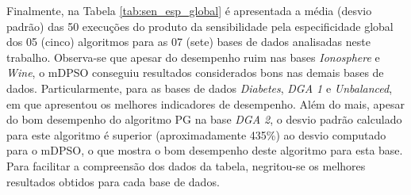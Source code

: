 \documentclass[
	12pt,				%
	openany,			%
	oneside,	
	a4paper,			%
	brazil,				%
	]{unimontes-ppgmsc-abntex2}
\begin{document}
\begin{table}[!ht]
\setlength{\arrayrulewidth}{.2em}
\vspace{12pt}
\centering{}
\caption{Desempenho dos algoritmos segundo a métrica sensibilidade $\times$ especificidade para cada classe da base {\em Wine}.}
\label{tab:sen_esp_classe_wine}
\end{table}

Finalmente, na Tabela \ref{tab:sen_esp_global} é apresentada a média (desvio padrão) das 50 execuções do produto da sensibilidade pela especificidade global dos 05 (cinco) algoritmos para as 07 (sete) bases de dados analisadas neste trabalho. Observa-se que apesar do desempenho ruim nas bases {\em Ionosphere} e {\em Wine}, o mDPSO conseguiu resultados considerados bons nas demais bases de dados. Particularmente, para as bases de dados {\em Diabetes}, {\em DGA 1} e {\em Unbalanced}, em que apresentou os melhores indicadores de desempenho. Além do mais, apesar do bom desempenho do algoritmo PG na base {\em DGA 2}, o desvio padrão calculado para este algoritmo é superior (aproximadamente 435\%) ao desvio computado para o mDPSO, o que mostra o bom desempenho deste algoritmo para esta base. Para facilitar a compreensão dos dados da tabela, negritou-se os melhores resultados obtidos para cada base de dados.
\end{document}
